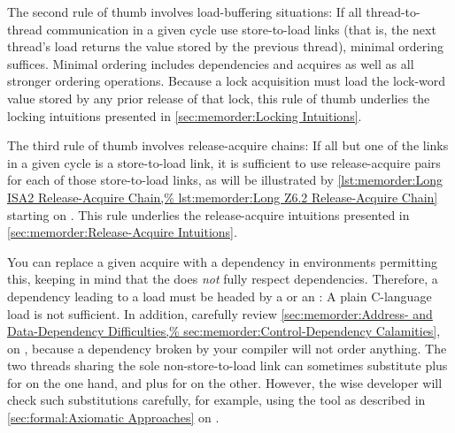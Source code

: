 The second rule of thumb involves load-buffering situations:
If all thread-to-thread communication in a given cycle use store-to-load
links (that is, the next thread's load returns the value stored by
the previous thread), minimal ordering suffices.
Minimal ordering includes dependencies and acquires as well as all stronger
ordering operations.
Because a lock acquisition must load the lock-word value stored by any
prior release of that lock, this rule of thumb underlies the locking
intuitions presented in
\cref{sec:memorder:Locking Intuitions}.

The third rule of thumb involves release-acquire chains:
If all but one of the links in a given cycle is a store-to-load
link, it is sufficient to use release-acquire pairs for each of
those store-to-load links, as will be illustrated by
\cref{lst:memorder:Long ISA2 Release-Acquire Chain,%
lst:memorder:Long Z6.2 Release-Acquire Chain}
starting on
.
This rule underlies the release-acquire intuitions presented in
\cref{sec:memorder:Release-Acquire Intuitions}.

You can replace a given acquire with a dependency in environments permitting
this, keeping in mind that the
 does \emph{not}
fully respect dependencies.
Therefore, a dependency leading to a load must be headed by
a  or an :
A plain C-language load is not sufficient.
In addition, carefully review
\cref{sec:memorder:Address- and Data-Dependency Difficulties,%
sec:memorder:Control-Dependency Calamities},
on
,
because a dependency broken by your compiler will not order anything.
The two threads sharing the sole non-store-to-load link can
sometimes substitute  plus  for
 on the one hand,
and  plus  for 
on the other.
However, the wise developer will check such substitutions carefully,
for example, using the  tool as described in
\cref{sec:formal:Axiomatic Approaches}
on
.

\QuickQuizEnd


